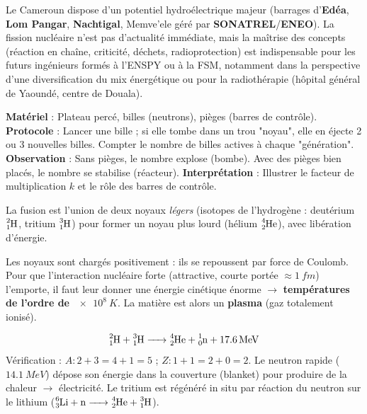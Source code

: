 \documentclass[11pt]{article}
\newcommand{\cle}[1]{{\popxbold\color{popdark}#1}}
\newcounter{popsec}
\newcounter{popsub}
\newcommand{\courssub}[1]{%
  \stepcounter{popsub}%
  \par\vspace{9pt}\noindent{\popxbold\fontsize{11.5}{13}\selectfont\color{popink}{\color{poporange}\thepopsec.\thepopsub}\hspace{6pt}#1}\par\nopagebreak\vspace{4pt}
}
\begin{document}
\begin{savaistu}
Le Cameroun dispose d'un potentiel hydroélectrique majeur (barrages d'\textbf{Edéa}, \textbf{Lom Pangar}, \textbf{Nachtigal}, Memve'ele géré par \textbf{SONATREL}/\textbf{ENEO}). La fission nucléaire n'est pas d'actualité immédiate, mais la maîtrise des concepts (réaction en chaîne, criticité, déchets, radioprotection) est indispensable pour les futurs ingénieurs formés à l'ENSPY ou à la FSM, notamment dans la perspective d'une diversification du mix énergétique ou pour la radiothérapie (hôpital général de Yaoundé, centre de Douala).
\end{savaistu}

\begin{experience}
\textbf{Matériel} : Plateau percé, billes (neutrons), pièges (barres de contrôle).
\textbf{Protocole} : Lancer une bille ; si elle tombe dans un trou "noyau", elle en éjecte 2 ou 3 nouvelles billes. Compter le nombre de billes actives à chaque "génération".
\textbf{Observation} : Sans pièges, le nombre explose (bombe). Avec des pièges bien placés, le nombre se stabilise (réacteur).
\textbf{Interprétation} : Illustrer le facteur de multiplication $k$ et le rôle des barres de contrôle.
\end{experience}

\courssub{Fusion nucléaire}

\begin{definition}
La \cle{fusion} est l'union de deux noyaux \emph{légers} (isotopes de l'hydrogène : deutérium $\ce{^{2}_{1}H}$, tritium $\ce{^{3}_{1}H}$) pour former un noyau plus lourd (hélium $\ce{^{4}_{2}He}$), avec libération d'énergie.
\end{definition}

\begin{propriete}
Les noyaux sont chargés positivement : ils se repoussent par force de Coulomb. Pour que l'interaction nucléaire forte (attractive, courte portée $\approx \SI{1}{fm}$) l'emporte, il faut leur donner une énergie cinétique énorme $\rightarrow$ \textbf{températures de l'ordre de $\SI{e8}{K}$}. La matière est alors un \textbf{plasma} (gaz totalement ionisé).
\end{propriete}

\begin{exemplebox}
\[ \ce{^{2}_{1}H + ^{3}_{1}H -> ^{4}_{2}He + ^{1}_{0}n + \SI{17,6}{MeV}} \]
Vérification : $A: 2+3=4+1=5$ ; $Z: 1+1=2+0=2$.
Le neutron rapide ($\SI{14,1}{MeV}$) dépose son énergie dans la couverture (blanket) pour produire de la chaleur $\rightarrow$ électricité. Le tritium est régénéré in situ par réaction du neutron sur le lithium ($\ce{^{6}_{3}Li + n -> ^{4}_{2}He + ^{3}_{1}H}$).
\end{exemplebox}
\end{document}
